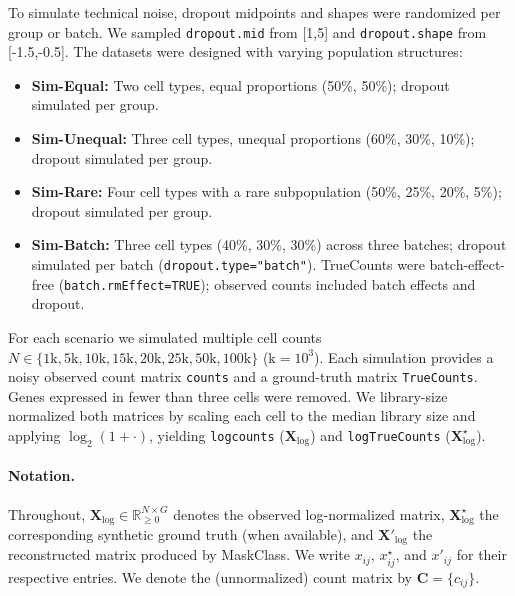 \documentclass{article}
\theoremstyle{plain}
\theoremstyle{definition}
\theoremstyle{remark}
\newenvironment{compitemize}
  {\begin{itemize}[noitemsep, topsep=0pt, parsep=0pt, partopsep=0pt]}
  {\end{itemize}}
\begin{document}
To simulate technical noise, dropout midpoints and shapes were randomized per group or batch. We sampled
\texttt{dropout.\allowbreak mid} from [1,5] and \texttt{dropout.\allowbreak shape} from [-1.5,-0.5].
The datasets were designed with varying population structures:

\begin{compitemize}
  \item \textbf{Sim-Equal:} Two cell types, equal proportions (50\%, 50\%); dropout simulated per group.
  \item \textbf{Sim-Unequal:} Three cell types, unequal proportions (60\%, 30\%, 10\%); dropout simulated per group.
  \item \textbf{Sim-Rare:} Four cell types with a rare subpopulation (50\%, 25\%, 20\%, 5\%); dropout simulated per group.
  \item \textbf{Sim-Batch:} Three cell types (40\%, 30\%, 30\%) across three batches; dropout simulated per batch (\texttt{dropout.type="batch"}). TrueCounts were batch-effect-free (\texttt{batch.rmEffect=TRUE}); observed counts included batch effects and dropout.
\end{compitemize}

For each scenario we simulated multiple cell counts
$N\in\{1\mathrm{k},5\mathrm{k},10\mathrm{k},15\mathrm{k},20\mathrm{k},25\mathrm{k},50\mathrm{k},100\mathrm{k}\}$ ($\mathrm{k}=10^3$). Each simulation
provides a noisy observed count matrix \texttt{counts} and a ground-truth matrix
\texttt{TrueCounts}. Genes expressed in fewer than three cells were removed. We
library-size normalized both matrices by scaling each cell to the median library
size and applying $\log_2(1+\cdot)$, yielding \texttt{logcounts}
($\mathbf{X}_{\log}$) and \texttt{logTrueCounts} ($\mathbf{X}^{\star}_{\log}$).

\paragraph{Notation.}
Throughout, $\mathbf{X}_{\log}\in\mathbb{R}_{\ge 0}^{N\times G}$ denotes the
observed log-normalized matrix, $\mathbf{X}^{\star}_{\log}$ the corresponding
synthetic ground truth (when available), and $\mathbf{X}'_{\log}$ the
reconstructed matrix
produced by MaskClass. We write $x_{ij}$, $x^{\star}_{ij}$, and $x'_{ij}$ for
their respective entries. We denote the (unnormalized) count matrix by
$\mathbf{C}=\{c_{ij}\}$.
\end{document}
